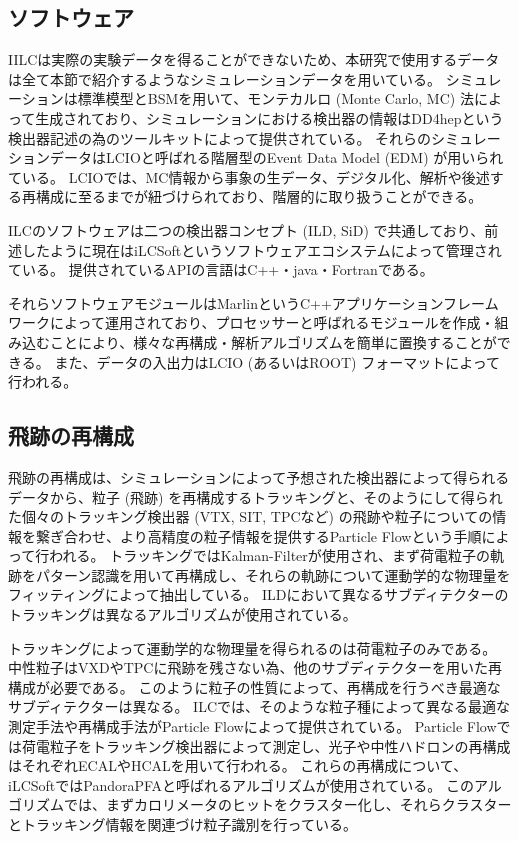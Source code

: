 \subsection{ソフトウェア} \label{Intro:SoftERILC:Software}

IILCは実際の実験データを得ることができないため、本研究で使用するデータは全て本節で紹介するようなシミュレーションデータを用いている。
シミュレーションは標準模型とBSMを用いて、モンテカルロ (Monte Carlo, MC) 法によって生成されており、シミュレーションにおける検出器の情報はDD4hep\cite{DD4heppaper1, DD4heppaper2}という検出器記述の為のツールキットによって提供されている。
それらのシミュレーションデータはLCIOと呼ばれる階層型のEvent Data Model (EDM) が用いられている。
LCIOでは、MC情報から事象の生データ、デジタル化、解析や後述する再構成に至るまでが紐づけられており、階層的に取り扱うことができる。

ILCのソフトウェアは二つの検出器コンセプト (ILD, SiD) で共通しており、前述したように現在はiLCSoftというソフトウェアエコシステムによって管理されている。
提供されているAPIの言語はC++・java・Fortranである。

それらソフトウェアモジュールはMarlin\cite{Marlinpaper}というC++アプリケーションフレームワークによって運用されており、プロセッサーと呼ばれるモジュールを作成・組み込むことにより、様々な再構成・解析アルゴリズムを簡単に置換することができる。
また、データの入出力はLCIO (あるいはROOT) フォーマットによって行われる。


\subsection{飛跡の再構成} \label{Intro:SoftERILC:ParticleReconstruction}

飛跡の再構成は、シミュレーションによって予想された検出器によって得られるデータから、粒子 (飛跡) を再構成するトラッキングと、そのようにして得られた個々のトラッキング検出器 (VTX, SIT, TPCなど) の飛跡や粒子についての情報を繋ぎ合わせ、より高精度の粒子情報を提供するParticle Flowという手順によって行われる。
トラッキングではKalman-Filterが使用され、まず荷電粒子の軌跡をパターン認識を用いて再構成し、それらの軌跡について運動学的な物理量をフィッティングによって抽出している。
ILDにおいて異なるサブディテクターのトラッキングは異なるアルゴリズムが使用されている。

トラッキングによって運動学的な物理量を得られるのは荷電粒子のみである。
中性粒子はVXDやTPCに飛跡を残さない為、他のサブディテクターを用いた再構成が必要である。
このように粒子の性質によって、再構成を行うべき最適なサブディテクターは異なる。
ILCでは、そのような粒子種によって異なる最適な測定手法や再構成手法がParticle Flowによって提供されている。
Particle Flowでは荷電粒子をトラッキング検出器によって測定し、光子や中性ハドロンの再構成はそれぞれECALやHCALを用いて行われる。
これらの再構成について、iLCSoftではPandoraPFAと呼ばれるアルゴリズムが使用されている。
このアルゴリズムでは、まずカロリメータのヒットをクラスター化し、それらクラスターとトラッキング情報を関連づけ粒子識別を行っている。

